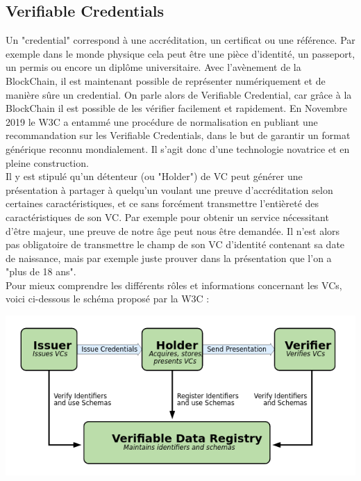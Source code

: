 \documentclass[12pt, openany]{report}
\begin{document}
\subsection{Verifiable Credentials}
\noindent 
\begin{flushleft}
Un "credential" correspond à une accréditation, un certificat ou une référence. Par exemple dans le monde physique cela peut être une pièce d'identité, un passeport, un permis ou encore un diplôme universitaire. Avec l'avènement de la BlockChain, il est maintenant possible de représenter numériquement et de manière sûre un credential. On parle alors de Verifiable Credential, car grâce à la BlockChain il est possible de les vérifier facilement et rapidement. En Novembre 2019 le W3C a entammé une procédure de normalisation en publiant une recommandation sur les Verifiable Credentials, dans le but de garantir un format générique reconnu mondialement. Il s'agit donc d'une technologie novatrice et en pleine construction.\\
Il y est stipulé qu'un détenteur (ou "Holder") de VC peut générer une présentation à partager à quelqu'un voulant une preuve d'accréditation selon certaines caractéristiques, et ce sans forcément transmettre l'entièreté des caractéristiques de son VC. Par exemple pour obtenir un service nécessitant d'être majeur, une preuve de notre âge peut nous être demandée. Il n'est alors pas obligatoire de transmettre le champ de son VC d'identité contenant sa date de naissance, mais par exemple juste prouver dans la présentation que l'on a "plus de 18 ans".\\

Pour mieux comprendre les différents rôles et informations concernant les VCs, voici ci-dessous le schéma proposé par la W3C :\\
\begin{center}
\includegraphics[scale=0.5]{vc.png}
\end{center}


\end{flushleft}
\end{document}
